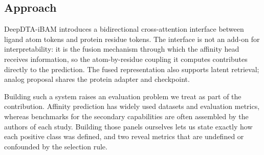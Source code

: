 \documentclass{ieeeaccess}
\begin{document}
\subsection{Approach}
DeepDTA-iBAM introduces a bidirectional cross-attention
interface between ligand atom tokens and protein residue tokens. The interface
is not an add-on for interpretability: it is the fusion mechanism through which
the affinity head receives information, so the atom-by-residue coupling it
computes contributes directly to the prediction. The fused representation also
supports latent retrieval; analog proposal shares the protein adapter and checkpoint.

Building such a system raises an evaluation problem we treat as part of the
contribution. Affinity prediction has widely used datasets and evaluation
metrics, whereas benchmarks for the secondary capabilities are often assembled
by the authors of each study.
Building those panels ourselves lets us state exactly how each positive class
was defined, and two reveal metrics that are undefined or confounded by the
selection rule.
\end{document}
